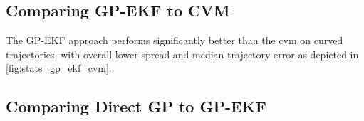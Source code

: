 \subsection{Comparing GP-EKF to CVM}
The GP-EKF approach performs significantly better than the \acrshort{cvm} on curved trajectories, with overall lower spread and median trajectory error as depicted in \cref{fig:stats_gp_ekf_cvm}.

\subsection{Comparing Direct GP to GP-EKF}
\begin{figure}
    \centering
\end{figure}
